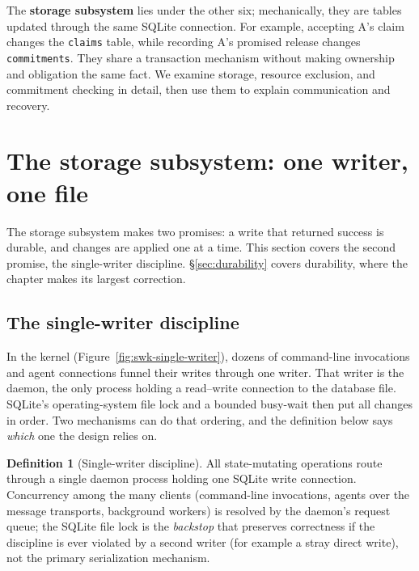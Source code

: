 \documentclass[11pt,a4paper]{article}
\theoremstyle{definition}
\newtheorem{definition}{Definition}[section]
\theoremstyle{remark}
\begin{document}
The \textbf{storage subsystem} lies under the other six; mechanically, they are
tables updated through the same SQLite connection. For example, accepting
A's claim changes the \texttt{claims} table, while recording A's promised
release changes \texttt{commitments}. They share a transaction mechanism
without making ownership and obligation the same fact. We examine storage,
resource exclusion, and commitment checking in detail, then use them to
explain communication and recovery.
\pdexercisepointer{\ref{ex:swk-organs-inmemory}}{\ref{ex:swk-organs-cut}}{\pageref{ex:swk-organs-inmemory}}
\section{The storage subsystem: one writer, one file}
\label{sec:substrate}
The storage subsystem makes two promises: a write that returned success is
durable, and changes are applied one at a time. This section covers the second
promise, the single-writer discipline. \S\ref{sec:durability} covers
durability, where the chapter makes its largest correction.
\subsection{The single-writer discipline}

In the kernel (Figure~\ref{fig:swk-single-writer}), dozens of command-line
invocations and agent connections funnel their writes through one writer. That writer
is the daemon, the only process holding a read--write connection to the
database file. SQLite's operating-system file lock and a bounded busy-wait then
put all changes in order. Two mechanisms can do that ordering, and the
definition below says \emph{which} one the design relies on.
\begin{definition}[Single-writer discipline]\label{def:single-writer}
\setlength{\parskip}{4pt plus 1pt}
All state-mutating operations route through a single daemon process holding one
SQLite write connection.
Concurrency among the many clients (command-line
invocations, agents over the message transports, background workers) is resolved
by the daemon's request queue; the SQLite file lock is the \emph{backstop} that
preserves correctness if the discipline is ever violated by a second writer (for
example a stray direct write), not the primary serialization mechanism.
\end{definition}
\end{document}
